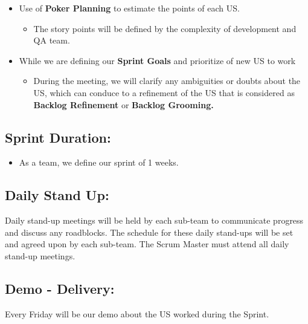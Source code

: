 \documentclass{article}
\providecommand{\tightlist}{
  \setlength{\itemsep}{0pt}\setlength{\parskip}{0pt}}
\begin{document}
\begin{itemize}
\tightlist
\item
  Use of \textbf{Poker Planning} to estimate the points of each US.

  \begin{itemize}
  \tightlist
  \item
    The story points will be defined by the complexity of development
    and QA team.
  \end{itemize}
\item
  While we are defining our \textbf{Sprint Goals} and prioritize of new
  US to work

  \begin{itemize}
  \tightlist
  \item
    During the meeting, we will clarify any ambiguities or doubts about
    the US, which can conduce to a refinement of the US that is
    considered as \textbf{Backlog Refinement} or \textbf{Backlog
    Grooming.}
  \end{itemize}
\end{itemize}

\hypertarget{sprintduration}{
\subsection{\texorpdfstring{\textbf{Sprint
Duration:}}{Sprint Duration:}}\label{sprintduration}}

\begin{itemize}
\tightlist
\item
  As a team, we define our sprint of 1 weeks.
\end{itemize}

\hypertarget{dailystandup}{
\subsection{Daily Stand Up:}\label{dailystandup}}

Daily stand-up meetings will be held by each sub-team to communicate
progress and discuss any roadblocks. The schedule for these daily
stand-ups will be set and agreed upon by each sub-team. The Scrum Master
must attend all daily stand-up meetings.

\hypertarget{demodelivery}{
\subsection{Demo - Delivery:}\label{demodelivery}}

Every Friday will be our demo about the US worked during the Sprint.
\end{document}
